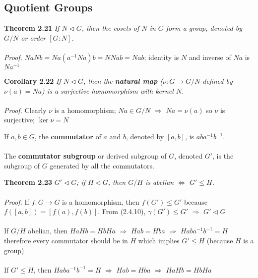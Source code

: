 \documentclass{article}
\begin{document}
\subsection {Quotient Groups}
\begin{redrules}\color{red}
\textbf{Theorem 2.21} \textit{If \(N\vartriangleleft G\), then the cosets of \(N\) in \(G\) form a group, denoted by \(G/N\) or order \([G:N]\).}\\\\\color{black}
\textit{Proof.} \(NaNb=Na(a^{-1}Na)b=NNab=Nab\); identity is \(N\) and inverse of \(Na\) is  \(Na^{-1}\)
\end{redrules}
\begin{greenrules}\color{OliveGreen}
\textbf{Corollary 2.22} \textit{If \(N\vartriangleleft G\), then the \textbf{natural map} (\(\nu:G\to G/N\) defined by \(\nu(a)=Na\)) is a surjective homomorphism with kernel \(N\).}\\\\\color{black}
\textit{Proof.} Clearly \(\nu\) is a homomorphism; \(Na\in G/N\) \(\Longrightarrow\) \(Na=\nu(a)\) so \(\nu\) is surjective; \(\ker\nu=N\)
\end{greenrules}
If \(a,b\in G\), the \textbf{commutator} of \(a\) and \(b\), denoted by \([a,b]\), is \(aba^{-1}b^{-1}\).\\\\
The \textbf{commutator subgroup} or derived subgroup of \(G\), denoted \(G'\), is the subgroup of \(G\) generated by all the commutators.
\begin{redrules}\color{red}
\textbf{Theorem 2.23} \textit{\(G'\vartriangleleft G\); if \(H\vartriangleleft G\), then \(G/H\) is abelian \(\Longleftrightarrow\) \(G'\le H\).}\\\\\color{black}
\textit{Proof.} If \(f:G\to G\) is a homomorphism, then \(f(G')\le G'\) because \(f([a,b])=[f(a),f(b)]\). From \color{gray}(2.4.10)\color{black}, \(\gamma(G')\le G'\) \(\Longrightarrow\) \(G'\vartriangleleft G\)\\\\
If \(G/H\) abelian, then \(HaHb=HbHa\) \(\Longrightarrow\) \(Hab=Hba\) \(\Longrightarrow\) \(Haba^{-1}b^{-1}=H\) therefore every commutator should be in \(H\) which implies \(G'\le H\) (because \(H\) is a group)\\\\
If \(G'\le H\), then \(Haba^{-1}b^{-1}=H\) \(\Longrightarrow\) \(Hab=Hba\) \(\Longrightarrow\) \(HaHb=HbHa\)
\end{redrules}
\end{document}
